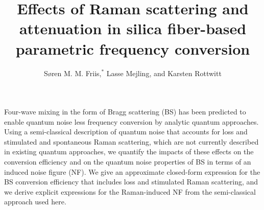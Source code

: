 \documentclass[10pt,letterpaper]{article}
\begin{document}
\title{Effects of Raman scattering and attenuation in silica fiber-based parametric frequency conversion}

\author{S\o{}ren M. M. Friis,$^{*}$ Lasse Mejling, and Karsten Rottwitt}

\address{Department of Photonics Engineering, Technical University of Denmark, \\ 2800 Kongens Lyngby, Denmark}




\begin{abstract*}
Four-wave mixing in the form of Bragg scattering (BS) has been predicted to enable quantum noise less frequency conversion by analytic quantum approaches. Using a semi-classical description of quantum noise that accounts for loss and stimulated and spontaneous Raman scattering, which are not currently described in existing quantum approaches, we quantify the impacts of these effects on the conversion efficiency and on the quantum noise properties of BS in terms of an induced noise figure (NF). We give an approximate closed-form expression for the BS conversion efficiency that includes loss and stimulated Raman scattering, and we derive explicit expressions for the Raman-induced NF from the semi-classical approach used here. \vspace{1cm}
\end{abstract*}

\end{document}
